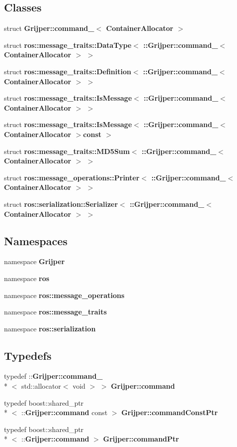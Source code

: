 \subsection*{Classes}
\begin{DoxyCompactItemize}
\item 
struct {\bf Grijper\-::command\-\_\-$<$ Container\-Allocator $>$}
\item 
struct {\bf ros\-::message\-\_\-traits\-::\-Data\-Type$<$ \-::\-Grijper\-::command\-\_\-$<$ Container\-Allocator $>$ $>$}
\item 
struct {\bf ros\-::message\-\_\-traits\-::\-Definition$<$ \-::\-Grijper\-::command\-\_\-$<$ Container\-Allocator $>$ $>$}
\item 
struct {\bf ros\-::message\-\_\-traits\-::\-Is\-Message$<$ \-::\-Grijper\-::command\-\_\-$<$ Container\-Allocator $>$ $>$}
\item 
struct {\bf ros\-::message\-\_\-traits\-::\-Is\-Message$<$ \-::\-Grijper\-::command\-\_\-$<$ Container\-Allocator $>$const  $>$}
\item 
struct {\bf ros\-::message\-\_\-traits\-::\-M\-D5\-Sum$<$ \-::\-Grijper\-::command\-\_\-$<$ Container\-Allocator $>$ $>$}
\item 
struct {\bf ros\-::message\-\_\-operations\-::\-Printer$<$ \-::\-Grijper\-::command\-\_\-$<$ Container\-Allocator $>$ $>$}
\item 
struct {\bf ros\-::serialization\-::\-Serializer$<$ \-::\-Grijper\-::command\-\_\-$<$ Container\-Allocator $>$ $>$}
\end{DoxyCompactItemize}
\subsection*{Namespaces}
\begin{DoxyCompactItemize}
\item 
namespace {\bf Grijper}
\item 
namespace {\bf ros}
\item 
namespace {\bf ros\-::message\-\_\-operations}
\item 
namespace {\bf ros\-::message\-\_\-traits}
\item 
namespace {\bf ros\-::serialization}
\end{DoxyCompactItemize}
\subsection*{Typedefs}
\begin{DoxyCompactItemize}
\item 
typedef \-::{\bf Grijper\-::command\-\_\-}\\*
$<$ std\-::allocator$<$ void $>$ $>$ {\bf Grijper\-::command}
\item 
typedef boost\-::shared\-\_\-ptr\\*
$<$ \-::{\bf Grijper\-::command} const  $>$ {\bf Grijper\-::command\-Const\-Ptr}
\item 
typedef boost\-::shared\-\_\-ptr\\*
$<$ \-::{\bf Grijper\-::command} $>$ {\bf Grijper\-::command\-Ptr}
\end{DoxyCompactItemize}
